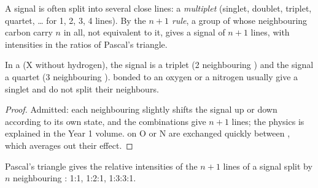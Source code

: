 \begin{definition}\label{def:g12:proton-nmr:multiplet}
A signal is often split into several close lines: a \emph{multiplet}
(singlet, doublet, triplet, quartet, \dots{} for 1, 2, 3, 4 lines). By the
\emph{$n+1$ rule}, a group of 
whose neighbouring carbon  carry $n$  in all, not equivalent to
it, gives a signal of $n+1$ lines, with intensities in the ratios of
Pascal's triangle.
\end{definition}

\begin{proposition}\label{prop:g12:proton-nmr:n-plus-one}
In a   (X without hydrogen), the  signal
is a triplet (2 neighbouring ) and the  signal a quartet
(3 neighbouring ).  bonded to an oxygen or a nitrogen 
usually give a singlet and do not split their neighbours.
\end{proposition}

\begin{proof}
Admitted: each neighbouring  slightly shifts the signal up or down
according to its own state, and the combinations give $n+1$ lines; the
physics is explained in the Year 1 volume.  on O or N are
exchanged quickly between , which averages out their effect.
\end{proof}

\begin{omfigure}

{\small Pascal's triangle gives the relative intensities of the $n+1$
lines of a signal split by $n$ neighbouring : 1:1, 1:2:1, 1:3:3:1.}
\end{omfigure}

